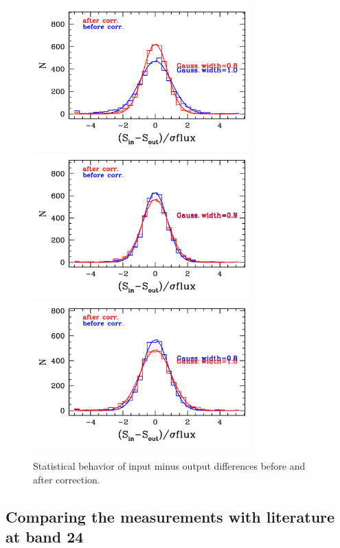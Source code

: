 \documentclass[11pt,a4paper]{article}
\begin{document}
\begin{figure}[H]
	\includegraphics[width=0.75\textwidth]{galsim_24_hist_dfcorr_1}
	\includegraphics[width=0.75\textwidth]{galsim_24_hist_dfcorr_2}
	\includegraphics[width=0.75\textwidth]{galsim_24_hist_dfcorr_3}
	\caption{Statistical behavior of input minus output differences before and after correction.}
\end{figure}




\subsection{Comparing the measurements with literature at band 24}
\end{document}
